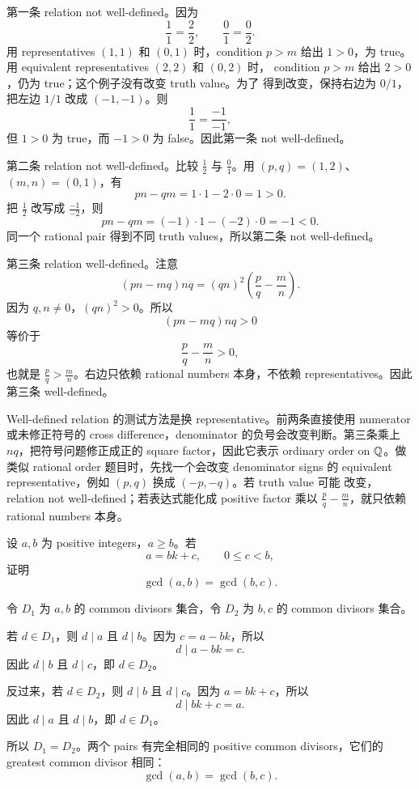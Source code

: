 \begin{solution}
第一条 relation not well-defined。因为
\[
  \frac11=\frac22,\qquad \frac01=\frac02.
\]
用 representatives \((1,1)\) 和 \((0,1)\) 时，condition \(p>m\) 给出
\(1>0\)，为 true。用 equivalent representatives \((2,2)\) 和 \((0,2)\) 时，
condition \(p>m\) 给出 \(2>0\)，仍为 true；这个例子没有改变 truth value。为了
得到改变，保持右边为 \(0/1\)，把左边 \(1/1\) 改成 \((-1,-1)\)。则
\[
  \frac11=\frac{-1}{-1},
\]
但 \(1>0\) 为 true，而 \(-1>0\) 为 false。因此第一条 not well-defined。

第二条 relation not well-defined。比较 \(\frac12\) 与 \(\frac01\)。用
\((p,q)=(1,2)\)、\((m,n)=(0,1)\)，有
\[
  pn-qm=1\cdot1-2\cdot0=1>0.
\]
把 \(\frac12\) 改写成 \(\frac{-1}{-2}\)，则
\[
  pn-qm=(-1)\cdot1-(-2)\cdot0=-1<0.
\]
同一个 rational pair 得到不同 truth values，所以第二条 not well-defined。

第三条 relation well-defined。注意
\[
  (pn-mq)nq=(qn)^2\left(\frac pq-\frac mn\right).
\]
因为 \(q,n\neq0\)，\((qn)^2>0\)。所以
\[
  (pn-mq)nq>0
\]
等价于
\[
  \frac pq-\frac mn>0,
\]
也就是 \(\frac pq>\frac mn\)。右边只依赖 rational numbers 本身，不依赖
representatives。因此第三条 well-defined。
\end{solution}

\begin{explanation}
Well-defined relation 的测试方法是换 representative。前两条直接使用 numerator
或未修正符号的 cross difference，denominator 的负号会改变判断。第三条乘上
\(nq\)，把符号问题修正成正的 square factor，因此它表示 ordinary order on
\(\mathbb{Q}\)。做类似 rational order 题目时，先找一个会改变 denominator signs 的
equivalent representative，例如 \((p,q)\) 换成 \((-p,-q)\)。若 truth value 可能
改变，relation not well-defined；若表达式能化成 positive factor 乘以
\(\frac pq-\frac mn\)，就只依赖 rational numbers 本身。
\end{explanation}

\begin{exerciseblock}
设 \(a,b\) 为 positive integers，\(a\geq b\)。若
\[
  a=bk+c,\qquad 0\leq c<b,
\]
证明
\[
  \gcd(a,b)=\gcd(b,c).
\]
\end{exerciseblock}

\begin{solution}
令 \(D_1\) 为 \(a,b\) 的 common divisors 集合，令 \(D_2\) 为 \(b,c\) 的 common
divisors 集合。

若 \(d\in D_1\)，则 \(d\mid a\) 且 \(d\mid b\)。因为 \(c=a-bk\)，所以
\[
  d\mid a-bk=c.
\]
因此 \(d\mid b\) 且 \(d\mid c\)，即 \(d\in D_2\)。

反过来，若 \(d\in D_2\)，则 \(d\mid b\) 且 \(d\mid c\)。因为 \(a=bk+c\)，所以
\[
  d\mid bk+c=a.
\]
因此 \(d\mid a\) 且 \(d\mid b\)，即 \(d\in D_1\)。

所以 \(D_1=D_2\)。两个 pairs 有完全相同的 positive common divisors，它们的
greatest common divisor 相同：
\[
  \gcd(a,b)=\gcd(b,c).
\]
\end{solution}

